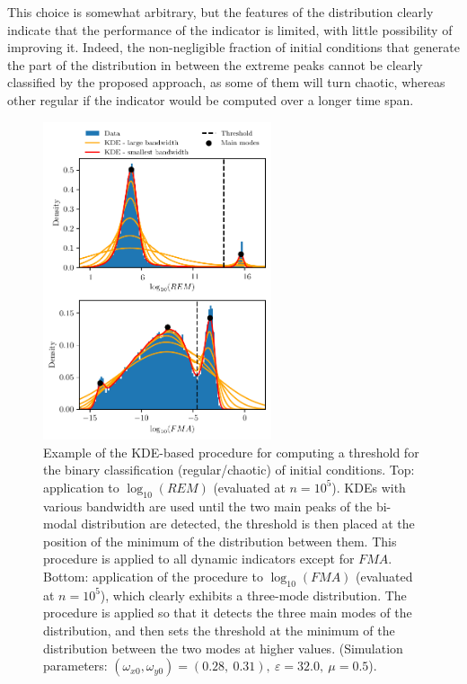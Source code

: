 This choice is somewhat arbitrary, but the features of the distribution clearly indicate that the performance of the indicator is limited, with little possibility of improving it. Indeed, the non-negligible fraction of initial conditions that generate the part of the distribution in between the extreme peaks cannot be clearly classified by the proposed approach, as some of them will turn chaotic, whereas other regular if the indicator would be computed over a longer time span.  

\begin{figure}[htp]
    \centering
    \includegraphics[width=0.6\textwidth]{6_dynamic_indicators/fig/edited_edited_thresholds.pdf}
    \caption{Example of the KDE-based procedure for computing a threshold for the binary classification (regular/chaotic) of initial conditions. Top: application to $\log_{10}(REM)$ (evaluated at $n=10^5$). KDEs with various bandwidth are used until the two main peaks of the bi-modal distribution are detected, the threshold is then placed at the position of the minimum of the distribution between them. This procedure is applied to all dynamic indicators except for $FMA$. Bottom: application of the procedure to $\log_{10}(FMA)$ (evaluated at $n=10^5$), which clearly exhibits a three-mode distribution. The procedure is applied so that it detects the three main modes of the distribution, and then sets the threshold at the minimum of the distribution between the two modes at higher values. (Simulation parameters:  $(\omega_{x0},\omega_{y0})= (0.28,\ 0.31),\ \varepsilon=32.0,\ \mu=0.5$).}
    \label{fig:thresholds}
\end{figure}

